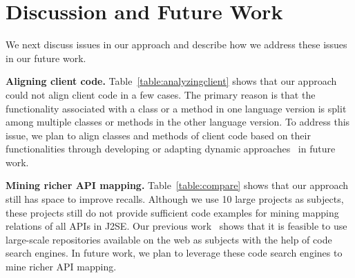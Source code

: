 

\section{Discussion and Future Work}
\label{sec:discuss}

We next discuss issues in our approach and describe how we address
these issues in our future work.

\textbf{Aligning client code.} Table~\ref{table:analyzingclient}
shows that our approach could not align client code in a few cases.
The primary reason is that the functionality associated with a class
or a method in one language version is split among multiple classes
or methods in the other language version. To address this issue, we
plan to align classes and methods of client code based on their
functionalities through developing or adapting dynamic approaches~\cite{jiang2009automatic} in future work.

\textbf{Mining richer API mapping.} Table~\ref{table:compare} shows
that our approach still has space to improve recalls. Although we
use 10 large projects as subjects, these projects still do not
provide sufficient code examples for mining mapping relations of all
APIs in J2SE. Our previous work~\cite{thummalapenta07parseweb} shows
that it is feasible to use large-scale repositories available on the
web as subjects with the help of code search engines. In
future work, we plan to leverage these code search engines to mine
richer API mapping.



